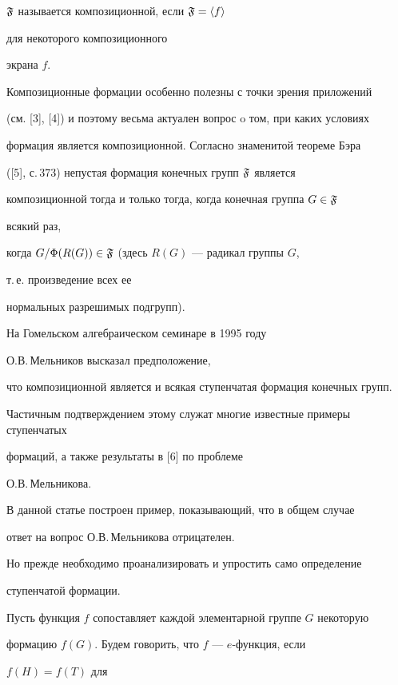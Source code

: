 $\frak{F}$ называется композиционной, если $\frak{F}=\langle f\rangle$


для некоторого композиционного


экрана $f$.





Композиционные формации особенно полезны с точки зрения приложений


(см. [3], [4]) и поэтому весьма актуален вопрос o том, при каких условиях


формация является композиционной. Согласно знаменитой теореме Бэра


([5], с.\,373) непустая формация конечных групп $\frak{F}$ является


композиционной тогда и только тогда, когда конечная группа $G\in\frak{F}$


всякий раз,


когда $G/\Phi(R(G))\in\frak{F}$ (здесь $R(G)$ --- радикал группы $G$,


т.\,е. произведение всех ее


нормальных разрешимых подгрупп).





На Гомельском алгебраическом семинаре в 1995 году


О.В.\,Мельников высказал предположение,


что композиционной является и всякая ступенчатая формация конечных групп.


Частичным подтверждением этому служат многие известные примеры ступенчатых


формаций, а также результаты в [6] по проблеме


О.В.\,Мельникова.





В данной статье построен пример, показывающий, что в общем случае


ответ на вопрос О.В.\,Мельникова отрицателен.


Но прежде необходимо проанализировать и упростить само определение


ступенчатой формации.





Пусть функция $f$ сопоставляет каждой элементарной группе $G$ некоторую


формацию $f(G)$. Будем говорить, что $f$ --- $e$-функция, если


$f(H)=f(T)$ для


